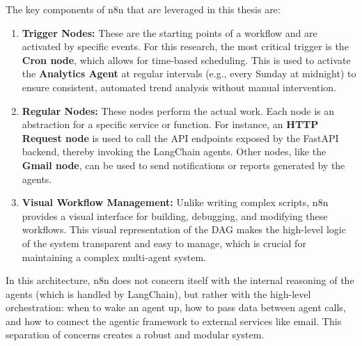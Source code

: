 The key components of n8n that are leveraged in this thesis are:
\begin{enumerate}
    \item \textbf{Trigger Nodes:} These are the starting points of a workflow and are activated by specific events. For this research, the most critical trigger is the \textbf{Cron node}, which allows for time-based scheduling. This is used to activate the \textbf{Analytics Agent} at regular intervals (e.g., every Sunday at midnight) to ensure consistent, automated trend analysis without manual intervention.
    \item \textbf{Regular Nodes:} These nodes perform the actual work. Each node is an abstraction for a specific service or function. For instance, an \textbf{HTTP Request node} is used to call the API endpoints exposed by the FastAPI backend, thereby invoking the LangChain agents. Other nodes, like the \textbf{Gmail node}, can be used to send notifications or reports generated by the agents.
    \item \textbf{Visual Workflow Management:} Unlike writing complex scripts, n8n provides a visual interface for building, debugging, and modifying these workflows. This visual representation of the DAG makes the high-level logic of the system transparent and easy to manage, which is crucial for maintaining a complex multi-agent system.
\end{enumerate}
In this architecture, n8n does not concern itself with the internal reasoning of the agents (which is handled by LangChain), but rather with the high-level orchestration: when to wake an agent up, how to pass data between agent calls, and how to connect the agentic framework to external services like email. This separation of concerns creates a robust and modular system.

